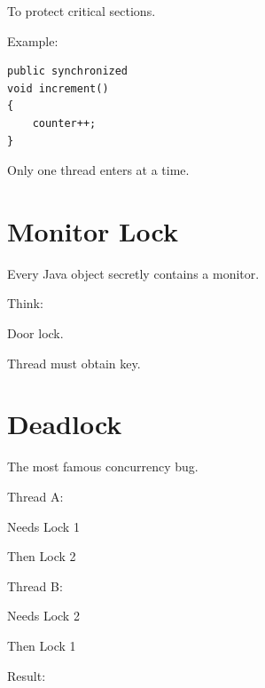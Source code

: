 \documentclass[11pt,a4paper]{book}
\begin{document}

To protect critical sections.


Example:

\begin{verbatim} 
public synchronized
void increment()
{
    counter++;
}
\end{verbatim}


Only one thread enters
at a time.


\section{Monitor Lock}

Every Java object secretly
contains a monitor.


Think:


Door lock.


Thread must obtain key.


\section{Deadlock}

The most famous concurrency bug.


Thread A:

Needs Lock 1

Then Lock 2


Thread B:

Needs Lock 2

Then Lock 1


Result:
\end{document}
